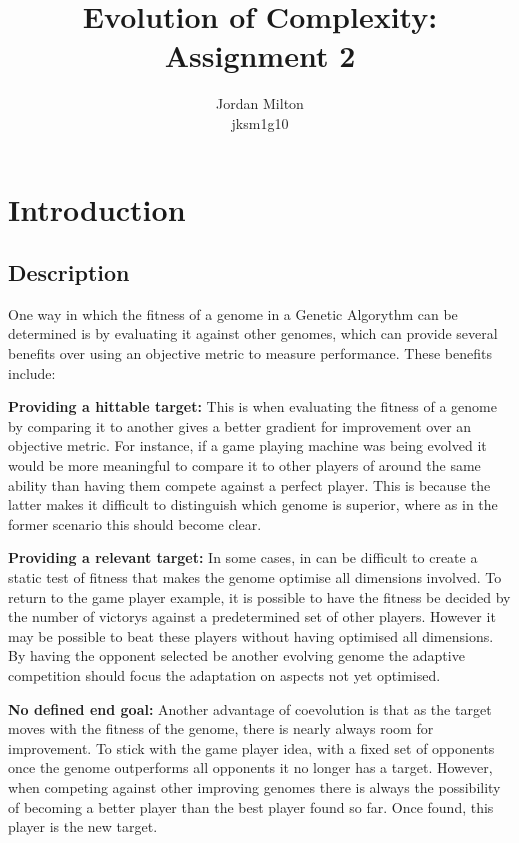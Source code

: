 \documentclass{article}
\author{Jordan Milton\\ jksm1g10}
\title{Evolution of Complexity: Assignment 2}
\begin{document}
\maketitle
\section{Introduction}
\subsection{Description}
One way in which the fitness of a genome in a Genetic Algorythm can be determined is by evaluating it against other genomes, which can provide several benefits over using an objective metric to measure performance. These benefits include:
\begin{description}
\item{\textbf{Providing a hittable target:}}
This is when evaluating the fitness of a genome by comparing it to another gives a better gradient for improvement over an objective metric. For instance, if a game playing machine was being evolved it would be more meaningful to compare it to other players of around the same ability than having them compete against a perfect player. This is because the latter makes it difficult to distinguish which genome is superior, where as in the former scenario this should become clear.
\item{\textbf{Providing a relevant target:}}
In some cases, in can be difficult to create a static test of fitness that makes the genome optimise all dimensions involved. To return to the game player example, it is possible to have the fitness be decided by the number of victorys against a predetermined set of other players. However it may be possible to beat these players without having optimised all dimensions. By having the opponent selected be another evolving genome the adaptive competition should focus the adaptation on aspects not yet optimised.
\item{\textbf{No defined end goal:}}
Another advantage of coevolution is that as the target moves with the fitness of the genome, there is nearly always room for improvement. To stick with the game player idea, with a fixed set of opponents once the genome outperforms all opponents it no longer has a target. However, when competing against other improving genomes there is always the possibility of becoming a better player than the best player found so far. Once found, this player is the new target.
\end{description}
\end{document}
